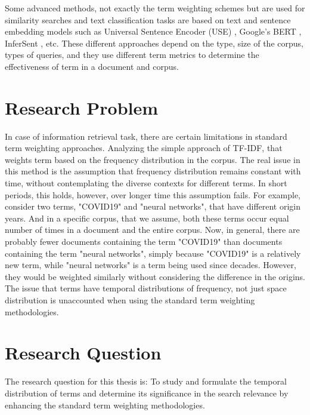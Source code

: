 	Some advanced methods, not exactly the term weighting schemes but are used for similarity searches and text classification tasks are based on text and sentence embedding models such as Universal Sentence Encoder (USE) \cite{RN32}, Google’s BERT  \cite{DBLP:journals/corr/abs-1810-04805}, InferSent \cite{DBLP:journals/corr/ConneauKSBB17}, etc. These different approaches depend on the type, size of the corpus, types of queries, and they use different term metrics to determine the effectiveness of term in a document and corpus.
	
	\section{Research Problem}
	In case of information retrieval task, there are certain limitations in standard term weighting approaches. Analyzing the simple approach of TF-IDF, that weights term based on the frequency distribution in the corpus. The real issue in this method is the assumption that frequency distribution remains constant with time, without contemplating the diverse contexts for different terms. In short periods, this holds, however, over longer time this assumption fails. For example, consider two terms, "COVID19" and "neural networks", that have different origin years. And in a specific corpus, that we assume, both these terms occur equal number of times in a document and the entire corpus. Now, in general, there are probably fewer documents containing the term "COVID19" than documents containing the term "neural networks", simply because "COVID19" is a relatively new term, while "neural networks" is a term being used since decades. However, they would be weighted similarly without considering the difference in the origins. The issue that terms have temporal distributions of frequency, not just space distribution is unaccounted when using the standard term weighting methodologies.

    \section{Research Question}
	The research question for this thesis is:
	To study and formulate the temporal distribution of terms and determine its significance in the search relevance by enhancing the standard term weighting methodologies.
	
